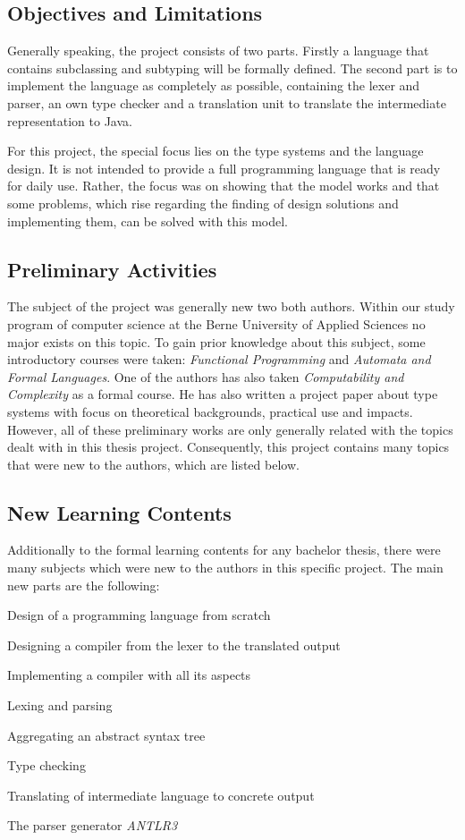 \subsection{Objectives and Limitations}
Generally speaking, the project consists of two parts. Firstly a language
that contains subclassing and subtyping will be formally defined. The
second part is to implement the language as completely as possible, containing
the lexer and parser, an own type checker and a translation unit to translate
the intermediate representation to Java.

For this project, the special focus lies on the type systems and the
language design. It is not intended to provide a full programming language
that is ready for daily use. Rather, the focus was on showing that the
model works and that some problems, which rise regarding the finding of
design solutions and implementing them, can be solved with this model.

\subsection{Preliminary Activities}
The subject of the project was generally new two both authors. Within
our study program of computer science at the Berne University of Applied
Sciences no major exists on this topic. To gain prior knowledge about
this subject, some introductory courses were taken: \emph{Functional
Programming} and \emph{Automata and Formal Languages}.  One of the
authors has also taken \emph{Computability and Complexity} as a formal
course. He has also written a project paper about type systems with
focus on theoretical backgrounds, practical use and impacts. However,
all of these preliminary works are only generally related with the topics
dealt with in this thesis project. Consequently, this project contains many
topics that were new to the authors, which are listed below.

\subsection{New Learning Contents}
Additionally to the formal learning contents for any bachelor thesis, there were many
subjects which were new to the authors in this specific project. The main new parts are the following:

\squishlist
	\item Design of a programming language from scratch
	\item Designing a compiler from the lexer to the translated output
	\item Implementing a compiler with all its aspects
	\squishlist
		\item Lexing and parsing
		\item Aggregating an abstract syntax tree
		\item Type checking
		\item Translating of intermediate language to concrete output
	\squishend
	\item The parser generator \emph{ANTLR3}
\squishend

